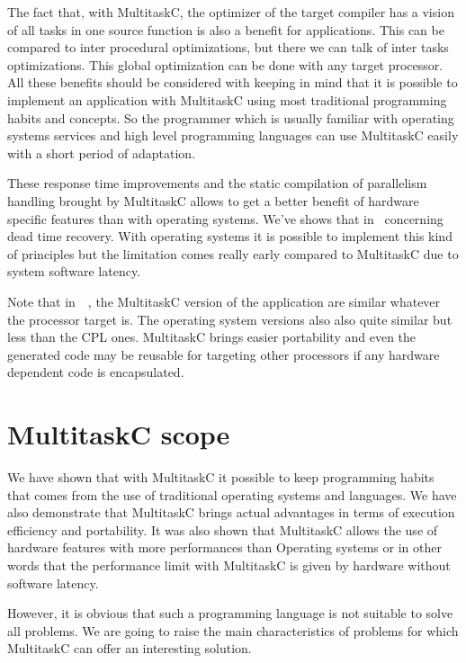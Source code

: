 \documentclass[10pt]{report}
\begin{document}
The fact that, with MultitaskC, the optimizer of the target compiler has a vision of all tasks in one source function
is also a benefit for applications. This can be compared to inter procedural optimizations, but there we can talk of
inter tasks optimizations. This global optimization can be done with any target processor. All these benefits should
be considered with keeping in mind that it is possible to implement an application with MultitaskC using most
traditional programming habits and concepts. So the programmer which is usually familiar with operating systems
services and high level programming languages can use MultitaskC easily with a short period of adaptation.

These response time improvements and the static compilation of parallelism handling brought by MultitaskC allows to
get a better benefit of hardware specific features than with operating systems. We've shows that in~\cite{Delchini:95}
concerning dead time recovery. With operating systems it is possible to implement this kind of principles but the
limitation comes really early compared to MultitaskC due to system software latency.

Note that in~~\cite{Delchini:95}, the MultitaskC version of the application are similar whatever the processor target
is. The operating system versions also also quite similar but less than the CPL ones. MultitaskC brings easier
portability and even the generated code may be reusable for targeting other processors if any hardware dependent
code is encapsulated.

\section{MultitaskC scope}

We have shown that with MultitaskC it possible to keep programming habits that comes from the use of traditional
operating systems and languages. We have also demonstrate that MultitaskC brings actual advantages in terms of
execution efficiency and portability. It was also shown that MultitaskC allows the use of hardware features with
more performances than Operating systems or in other words that the performance limit with MultitaskC is given
by hardware without software latency.

However, it is obvious that such a programming language is not suitable to solve all problems. We are going to
raise the main characteristics of problems for which MultitaskC can offer an interesting solution.
\end{document}

